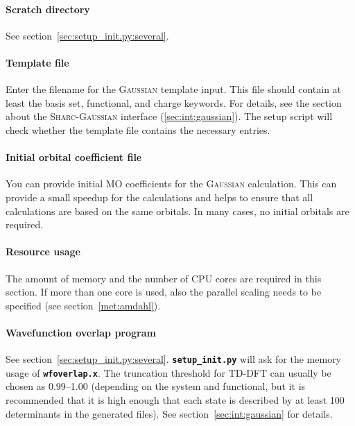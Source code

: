 \documentclass[a4paper,10pt,DIV=15,openany]{scrbook}
\newcommand{\sharc}{\textsc{Sharc}}
\newcommand{\ttt}[1]{\textbf{\texttt{#1}}}
\begin{document}
\paragraph{Scratch directory}

See section~\ref{sec:setup_init.py:several}.

\paragraph{Template file}

Enter the filename for the \textsc{Gaussian} template input. This file should contain at least the basis set, functional, and charge keywords. For details, see the section about the \sharc-\textsc{Gaussian} interface (\ref{sec:int:gaussian}). The setup script will check whether the template file contains the necessary entries. 

\paragraph{Initial orbital coefficient file}

You can provide initial MO coefficients for the \textsc{Gaussian} calculation. This can provide a small speedup for the calculations and helps to ensure that all calculations are based on the same orbitals.
In many cases, no initial orbitals are required.

\paragraph{Resource usage}

The amount of memory and the number of CPU cores are required in this section. If more than one core is used, also the parallel scaling needs to be specified (see section~\ref{met:amdahl}).

\paragraph{Wavefunction overlap program}

See section~\ref{sec:setup_init.py:several}. \ttt{setup\_init.py} will ask for the memory usage of \ttt{wfoverlap.x}. The truncation threshold for TD-DFT can usually be chosen as 0.99--1.00 (depending on the system and functional, but it is recommended that it is high enough that each state is described by at least 100 determinants in the generated files). See section~\ref{sec:int:gaussian} for details.
\end{document}
